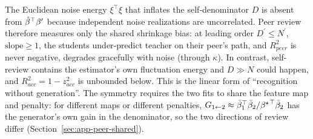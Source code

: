 \begin{remark}
The Euclidean noise energy $\xi^\top \xi$ that inflates the self-denominator
$D$ is absent from ${\hat{\beta}}^\top{\beta^{\prime}}$ because independent noise
realizations are uncorrelated.  Peer review therefore measures only the shared shrinkage bias: 
at leading order $D^\prime\leq N^\prime$, $\mathrm{slope}\geq1$, the students under-predict teacher on their peer's path, and $R^2_{peer}$ is never negative,
degrades gracefully with noise (through $\kappa$). 
In contrast, self-review contains the estimator's own fluctuation energy and $D \gg N$ could happen, and $R^2_{acc}=1-z_{acc}^2$ is unbounded below.  
This is the linear form of ``recognition without generation''.  
The symmetry requires the two fits to share the feature map and
penalty: for different maps or different penalties, $G_{1\leftarrow2}\approx
\bar\beta_1^\top\bar\beta_2/{{\beta^{\star}}}^\top\bar\beta_2$ has the generator's own gain in the denominator, so the two directions of review differ (Section~\ref{sec:app-peer-shared}).
\end{remark}



